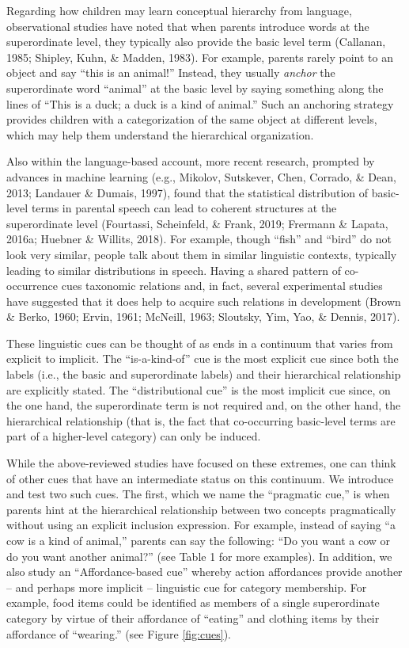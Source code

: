 \documentclass[english,,man]{apa6}
\begin{document}
Regarding how children may learn conceptual hierarchy from language, observational studies have noted that when parents introduce words at the superordinate level, they typically also provide the basic level term (Callanan, 1985; Shipley, Kuhn, \& Madden, 1983). For example, parents rarely point to an object and say \enquote{this is an animal!} Instead, they usually \emph{anchor} the superordinate word \enquote{animal} at the basic level by saying something along the lines of \enquote{This is a duck; a duck is a kind of animal.} Such an anchoring strategy provides children with a categorization of the same object at different levels, which may help them understand the hierarchical organization.

Also within the language-based account, more recent research, prompted by advances in machine learning (e.g., Mikolov, Sutskever, Chen, Corrado, \& Dean, 2013; Landauer \& Dumais, 1997), found that the statistical distribution of basic-level terms in parental speech can lead to coherent structures at the superordinate level (Fourtassi, Scheinfeld, \& Frank, 2019; Frermann \& Lapata, 2016a; Huebner \& Willits, 2018). For example, though \enquote{fish} and \enquote{bird} do not look very similar, people talk about them in similar linguistic contexts, typically leading to similar distributions in speech. Having a shared pattern of co-occurrence cues taxonomic relations and, in fact, several experimental studies have suggested that it does help to acquire such relations in development (Brown \& Berko, 1960; Ervin, 1961; McNeill, 1963; Sloutsky, Yim, Yao, \& Dennis, 2017).

These linguistic cues can be thought of as ends in a continuum that varies from explicit to implicit. The \enquote{is-a-kind-of} cue is the most explicit cue since both the labels (i.e., the basic and superordinate labels) and their hierarchical relationship are explicitly stated. The \enquote{distributional cue} is the most implicit cue since, on the one hand, the superordinate term is not required and, on the other hand, the hierarchical relationship (that is, the fact that co-occurring basic-level terms are part of a higher-level category) can only be induced.

While the above-reviewed studies have focused on these extremes, one can think of other cues that have an intermediate status on this continuum. We introduce and test two such cues. The first, which we name the \enquote{pragmatic cue,} is when parents hint at the hierarchical relationship between two concepts pragmatically without using an explicit inclusion expression. For example, instead of saying \enquote{a cow is a kind of animal,} parents can say the following: \enquote{Do you want a cow or do you want another animal?} (see Table 1 for more examples). In addition, we also study an \enquote{Affordance-based cue} whereby action affordances provide another -- and perhaps more implicit -- linguistic cue for category membership. For example, food items could be identified as members of a single superordinate category by virtue of their affordance of \enquote{eating} and clothing items by their affordance of \enquote{wearing.} (see Figure \ref{fig:cues}).
\end{document}
